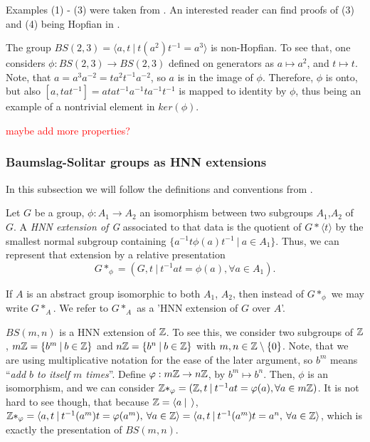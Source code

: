 Examples (1) - (3) were taken from \cite{CeSi23}. An interested reader can find proofs of (3) and (4) being Hopfian in \cite[~chapters I, IV]{LySch15}. 

\begin{importantexample}\cite[page 514]{BrHa11}
    The group $BS(2,3) = \langle a,t \: | \: t(a^2)t^{-1} = a^3\rangle $ is non-Hopfian. To see that, one considers $\phi: BS(2,3) \to BS(2,3)$ defined on generators as $a \mapsto a^2$, and $t \mapsto t$. Note, that $a = a^3a^{-2} = ta^2t^{-1}a^{-2}$, so $a$ is in the image of $\phi$. Therefore, $\phi$ is onto, but also $[a,tat^{-1}] = atat^{-1}a^{-1}ta^{-1}t^{-1}$ is mapped to identity by $\phi$, thus being an example of a nontrivial element in $ker(\phi)$.
\end{importantexample}

\textcolor{red}{maybe add more properties?}

\subsubsection{Baumslag-Solitar groups as HNN extensions}

In this subsection we will follow the definitions and conventions from \cite[pages 497-498]{BrHa11}.

\begin{definition}
\label{HNN}
    Let $G$ be a group, $\phi: A_1 \to A_2$ an isomorphism between two subgroups $A_1$,$A_2$ of $G$. A \emph{HNN extension of G} associated to that data is the quotient of $G \ast \langle t \rangle$ by the smallest normal subgroup containing $\{a^{-1}t\phi(a)t^{-1} \: | \: a \in A_1 \}$. Thus, we can represent that extension by a relative presentation 
    \[G \ast_\phi = ( G,t \: | \: t^{-1}at = \phi(a), \forall a \in A_1). \]
\end{definition}

\begin{remark}
    If $A$ is an abstract group isomorphic to both $A_1$, $A_2$, then instead of $G \ast _\phi$ we may write $G \ast _A$. We refer to $G \ast _A$ as a 'HNN extension of $G$ over $A$'.
\end{remark}

\begin{example}
    $BS(m,n)$ is a HNN extension of $\mathbb{Z}$. To see this, we consider two subgroups of $\mathbb{Z}$, $m\mathbb{Z} = \{b^m\: | \: b \in \mathbb{Z}\}$ and $n\mathbb{Z} = \{b^n\: | \: b \in \mathbb{Z}\}$ with $m,n \in \mathbb{Z} \setminus \{0\}$. Note, that we are using multiplicative notation for the ease of the later argument, so $b^m$ means ``\emph{add $b$ to itself $m$ times}''. Define $\varphi: m\mathbb{Z} \to n\mathbb{Z}$, by $b^m \mapsto b^n$. Then, $\phi$ is an isomorphism, and we can consider $\mathbb{Z}\ast_\varphi = (\mathbb{Z},t \: | \: t^{-1}at = \varphi(a), \forall a\in m\mathbb{Z})$. It is not hard to see though, that because $\mathbb{Z} = \langle a \: | \:\: \rangle$, $\mathbb{Z}\ast_\varphi = \langle a,t \: | \: t^{-1}(a^m)t = \varphi(a^m), \: \forall a\in \mathbb{Z} \rangle = \langle a,t \: | \: t^{-1}(a^m)t = a^n, \: \forall a\in \mathbb{Z} \rangle $, which is exactly the presentation of $BS(m,n)$.
\end{example}

